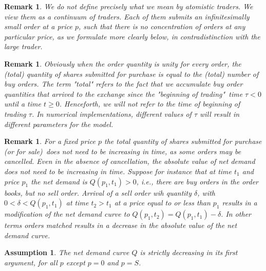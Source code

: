 \documentclass{article}
\newtheorem{remark}[theorem]{Remark}
\newtheorem{assumption}[theorem]{Assumption}
\begin{document}


\begin{remark}
We do not define precisely what we mean by atomistic
traders. We view them as a continuum of traders. Each of them submits an
infinitesimally small order at a price $p$, such that there is no
concentration of orders at any particular price, as we formulate more
clearly below, in contradistinction with the large trader.
\end{remark}


\begin{remark}
Obviously when the order quantity is unity for every
order, the (total) quantity of shares submitted for purchase is equal to the
(total) number of buy orders. The term "total" refers to the fact that we
accumulate buy order quantities that arrived to the exchange since the
"beginning of trading"\ time $\tau <0$ until a time $t\geq 0$. Henceforth,
we will not refer to the time of beginning of trading $\tau $. In numerical
implementations, different values of $\tau $ will result in different
parameters for the model.
\end{remark}


\begin{remark}
For a fixed price $p$ the total quantity of shares
submitted for purchase (or for sale)\ does not need to be increasing in
time, as some orders may be cancelled. Even in the absence of cancellation,
the absolute value of net demand does not need to be increasing in time.
Suppose for instance that at time $t_{1}$ and price $p_{1}$ the net demand
is $Q(p_{1},t_{1})>0$, i.e., there are buy orders in the order books, but no
sell order. Arrival of a sell order wih quantity $\delta $, with $0<\delta
<Q(p_{1},t_{1})$ at time $t_{2}>t_{1}$ at a price equal to or less than $%
p_{1}$ results in a modification of the net demand curve to $%
Q(p_{1},t_{2})=Q(p_{1},t_{1})-\delta $. In other terms orders matched
results in a decrease in the absolute value of the net demand curve.
\end{remark}


\begin{assumption} \label{ass::decrease_net_demand}
The net demand curve $Q$ is strictly decreasing in
its first argument, for all $p$ except $p=0$ and $p=S$.
\end{assumption}
\end{document}

